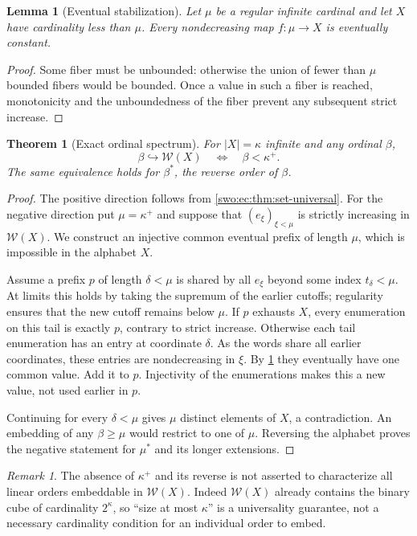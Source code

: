 \documentclass[11pt]{article}
\newtheorem{theorem}{Theorem}[section]
\newtheorem{lemma}[lemma]{Lemma}
\theoremstyle{definition}
\theoremstyle{remark}
\newtheorem{remark}[remark]{Remark}
\newcommand{\WO}{\mathcal W}
\newcommand{\emb}{\hookrightarrow}
\begin{document}
\begin{lemma}[Eventual stabilization]\label{swo:ec:lem:stabilize}
Let $\mu$ be a regular infinite cardinal and let $X$ have cardinality
less than $\mu$. Every nondecreasing map $f:\mu\to X$ is eventually
constant.
\end{lemma}
\begin{proof}
Some fiber must be unbounded: otherwise the union of fewer than $\mu$
bounded fibers would be bounded. Once a value in such a fiber is reached,
monotonicity and the unboundedness of the fiber prevent any subsequent
strict increase.
\end{proof}

\begin{theorem}[Exact ordinal spectrum]\label{swo:ec:thm:ordinal-spectrum}
For $|X|=\kappa$ infinite and any ordinal $\beta$,
\[
 \beta\emb\WO(X)\quad\Longleftrightarrow\quad\beta<\kappa^+.
\]
The same equivalence holds for $\beta^*$, the reverse order of $\beta$.
\end{theorem}
\begin{proof}
The positive direction follows from \cref{swo:ec:thm:set-universal}.
For the negative direction put $\mu=\kappa^+$ and suppose that
$(e_\xi)_{\xi<\mu}$ is strictly increasing in $\WO(X)$. We construct an
injective common eventual prefix of length $\mu$, which is impossible
in the alphabet $X$.

Assume a prefix $p$ of length $\delta<\mu$ is shared by all $e_\xi$ beyond
some index $t_\delta<\mu$. At limits this holds by taking the supremum of
the earlier cutoffs; regularity ensures that the new cutoff remains below
$\mu$. If $p$ exhausts $X$, every enumeration on this tail is exactly $p$,
contrary to strict increase. Otherwise each tail enumeration has an entry
at coordinate $\delta$. As the words share all earlier coordinates,
these entries are nondecreasing in $\xi$. By \cref{swo:ec:lem:stabilize} they
eventually have one common value. Add it to $p$. Injectivity of the
enumerations makes this a new value, not used earlier in $p$.

Continuing for every $\delta<\mu$ gives $\mu$ distinct elements of $X$,
a contradiction. An embedding of any $\beta\ge\mu$ would restrict to
one of $\mu$. Reversing the alphabet proves the negative statement for
$\mu^*$ and its longer extensions.
\end{proof}

\begin{remark}\label{swo:ec:n4.6}
The absence of $\kappa^+$ and its reverse is not asserted to characterize
all linear orders embeddable in $\WO(X)$. Indeed $\WO(X)$ already contains
the binary cube of cardinality $2^\kappa$, so ``size at most $\kappa$'' is
a universality guarantee, not a necessary cardinality condition for an
individual order to embed.
\end{remark}
\end{document}
